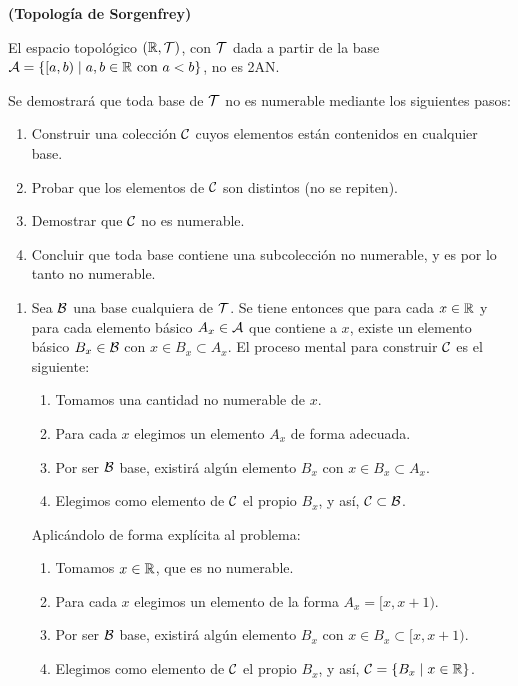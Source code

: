 \begin{ej}
    {\bf (Topología de Sorgenfrey)} 
    \item El espacio topológico $(\mathbb{R}, \mathcal{T})$, con $\mathcal{T}$ dada a partir de la base $\mathcal{A} = \{[a,b) \mid a,b \in \mathbb{R} \text{ con } a < b\}$, no es 2AN.\smallskip

    Se demostrará que toda base de $\mathcal{T}$ no es numerable mediante los siguientes pasos:

    \begin{enumerate}[topsep=0pt,itemsep=0pt]
        \item Construir una colección $\mathcal{C}$ cuyos elementos están contenidos en cualquier base.
        \item Probar que los elementos de $\mathcal{C}$ son distintos (no se repiten).
        \item Demostrar que $\mathcal{C}$ no es numerable.
        \item Concluir que toda base contiene una subcolección no numerable, y es por lo tanto no numerable.
    \end{enumerate}

    \begin{enumerate}[topsep=5pt,itemsep=0pt]
        \item Sea $\mathcal{B}$ una base cualquiera de $\mathcal{T}$. Se tiene entonces que para cada $x\in \mathbb{R}$ y para cada elemento básico $A_x \in \mathcal{A}$ que contiene a $x$, existe un elemento básico $B_x \in \mathcal{B}$ con $x \in B_x \subset A_x$. El proceso mental para construir $\mathcal{C}$ es el siguiente:
        \begin{enumerate}[topsep=2pt]
            \item Tomamos una cantidad no numerable de $x$.
            \item Para cada $x$ elegimos un elemento $A_x$ de forma adecuada.
            \item Por ser $\mathcal{B}$ base, existirá algún elemento $B_x$ con $x \in B_x \subset A_x$.
            \item Elegimos como elemento de $\mathcal{C}$ el propio $B_x$, y así, $\mathcal{C} \subset \mathcal{B}$.
        \end{enumerate}
        Aplicándolo de forma explícita al problema:
        \begin{enumerate}[topsep=2pt]
            \item Tomamos $x\in \mathbb{R}$, que es no numerable.
            \item Para cada $x$ elegimos un elemento de la forma $A_x = [x,x + 1)$.
            \item Por ser $\mathcal{B}$ base, existirá algún elemento $B_x$ con $x \in B_x \subset [x,x + 1)$.
            \item Elegimos como elemento de $\mathcal{C}$ el propio $B_x$, y así, $\mathcal{C} = \{B_x \mid  x\in \mathbb{R}\}$.
        \end{enumerate}


\end{enumerate}
\end{ej}
